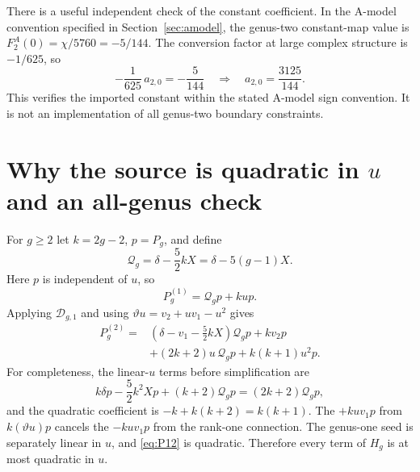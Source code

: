 \documentclass[11pt,a4paper]{article}
\numberwithin{equation}{section}
\newcommand{\tht}{\vartheta}
\newcommand{\Pg}[2]{P_{#1}^{(#2)}}
\begin{document}
There is a useful independent check of the constant coefficient. In the
A-model convention specified in Section~\ref{sec:amodel}, the genus-two
constant-map value is $F_2^A(0)=\chi/5760=-5/144$. The conversion factor
at large complex structure is $-1/625$, so
\begin{equation}
-\frac1{625}\,a_{2,0}=-\frac5{144}
\quad\Longrightarrow\quad a_{2,0}=\frac{3125}{144}.
\end{equation}
This verifies the imported constant within the stated A-model sign convention.
It is not an implementation of all genus-two boundary constraints.

\section{Why the source is quadratic in \texorpdfstring{$u$}{u} and an all-genus check}

For $g\ge2$ let $k=2g-2$, $p=P_g$, and define
\begin{equation}
\mathcal Q_g=\delta-\frac52kX=\delta-5(g-1)X.
\end{equation}
Here $p$ is independent of $u$, so
\begin{equation}
\Pg g1=\mathcal Q_gp+ku p.
\end{equation}
Applying $\mathcal D_{g,1}$ and using $\tht u=v_2+uv_1-u^2$ gives
\begin{equation}\boxed{\begin{aligned}
\Pg g2={}&(\delta-v_1-\tfrac52kX)\mathcal Q_gp+kv_2p\\
 &+(2k+2)u\,\mathcal Q_gp+k(k+1)u^2p.
\end{aligned}}\label{eq:quadraticvertex}
\end{equation}
For completeness, the linear-$u$ terms before simplification are
\begin{equation}
k\delta p-\frac52k^2Xp+(k+2)\mathcal Q_gp
  =(2k+2)\mathcal Q_gp,
\end{equation}
and the quadratic coefficient is $-k+k(k+2)=k(k+1)$.
The $+kuv_1p$ from $k(\tht u)p$ cancels the $-kuv_1p$ from
the rank-one connection.
The genus-one seed is separately linear in $u$, and \eqref{eq:P12}
is quadratic. Therefore every term of $H_g$ is at most quadratic in $u$.
\end{document}
